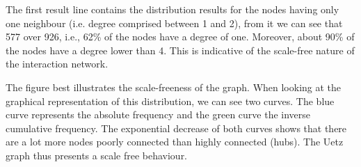 The first result line contains the distribution results for
the nodes having only one neighbour (i.e. degree comprised between 1 and 2), from it
we can see that 577 over 926, i.e., 62\%  of the nodes have a degree of one. 
Moreover, about 90\% of the nodes have a degree lower than 4. This is indicative of the scale-free
nature of the interaction network.

The figure best illustrates the scale-freeness of the graph. 
When looking at the graphical representation of this distribution, we can see two curves.
The blue curve represents the absolute frequency and the green curve the inverse cumulative 
frequency. 
The exponential decrease of both curves shows that there are a lot more nodes poorly 
connected than highly connected (hubs). The Uetz graph thus presents a scale free behaviour.
